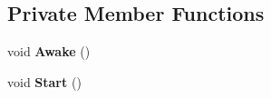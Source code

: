 \subsection*{Private Member Functions}
\begin{DoxyCompactItemize}
\item 
\mbox{\label{class_t_m_pro_1_1_examples_1_1_text_mesh_pro_floating_text_a1fa7fb625c94c5c07325020bca35da52}} 
void {\bfseries Awake} ()
\item 
\mbox{\label{class_t_m_pro_1_1_examples_1_1_text_mesh_pro_floating_text_adf09f894fc266a9d626e18ce2ef3a1f3}} 
void {\bfseries Start} ()
\end{DoxyCompactItemize}
